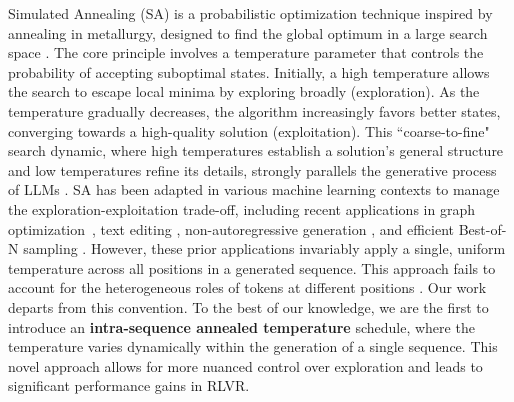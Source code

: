 Simulated Annealing (SA) is a probabilistic optimization technique inspired by annealing in metallurgy, designed to find the global optimum in a large search space \citep{kirkpatrick1983optimization, bertsimas1993simulated}. The core principle involves a temperature parameter that controls the probability of accepting suboptimal states. Initially, a high temperature allows the search to escape local minima by exploring broadly (exploration). As the temperature gradually decreases, the algorithm increasingly favors better states, converging towards a high-quality solution (exploitation).
This ``coarse-to-fine" search dynamic, where high temperatures establish a solution's general structure and low temperatures refine its details, strongly parallels the generative process of LLMs \citep{yang2025alignment}. SA has been adapted in various machine learning contexts to manage the exploration-exploitation trade-off, including recent applications in graph optimization~\citep{liu2021simulated}, text editing \citep{zhang2024edt}, non-autoregressive generation \citep{israel2025enabling}, and efficient Best-of-N sampling \citep{manvi2024adaptive}. However, these prior applications invariably apply a single, uniform temperature across all positions in a generated sequence. This approach fails to account for the heterogeneous roles of tokens at different positions \citep{wang2025beyond}. Our work departs from this convention. To the best of our knowledge, we are the first to introduce an \textbf{intra-sequence annealed temperature} schedule, where the temperature varies dynamically within the generation of a single sequence. This novel approach allows for more nuanced control over exploration and leads to significant performance gains in RLVR.